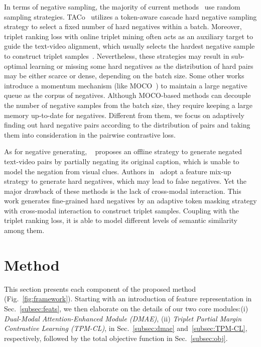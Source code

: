 \documentclass[sigconf]{acmart}
\begin{document}
In terms of negative sampling, the majority of current methods~\cite{actbert2020,univl2020,frozen2021,clip4clip2021,videoclip2022,xclip2022,ts2net2022} use random sampling strategies.
TACo~\cite{taco2021} utilizes a token-aware cascade hard negative sampling strategy to select a fixed number of hard negatives within a batch. 
Moreover, triplet ranking loss with online triplet mining often acts as an auxiliary target to guide the text-video alignment, which usually selects the hardest negative sample to construct triplet samples~\cite{Dong2021DualEF,acp2022,hanet2021}.
Nevertheless, these strategies may result in sub-optimal learning or missing some hard negatives
as the distribution of hard pairs may be either scarce or dense, depending on the batch size.
Some other works~\cite{hit2021,lgdn2022, sstvlmss2022} introduce a momentum mechanism (like MOCO~\cite{moco2019}) to maintain a large negative queue as the corpus of negatives. Although MOCO-based methods can decouple the number of negative samples from the batch size, they require keeping a large memory up-to-date for negatives.
Different from them, we focus on adaptively finding out hard negative pairs according to the distribution of pairs and taking them into consideration in the pairwise contrastive loss.

As for negative generating, ~\cite{Wang2022LearnTU} proposes an offline strategy to generate negated text-video pairs by partially negating its original caption, which is unable to model the negation from visual clues. 
Authors in~\cite{MoCHi2020} adopt a feature mix-up strategy to generate hard negatives, which may lead to false negatives. Yet the major drawback of these methods is the lack of cross-modal interaction.  
This work generates fine-grained hard negatives by an adaptive token masking strategy with cross-modal interaction to construct triplet samples.
Coupling with the triplet ranking loss, it is able to model different levels of semantic similarity among them.

\section{Method}
This section presents each component of the proposed method (Fig.~\ref{fig:framework}). Starting with an introduction of feature representation in Sec.~\ref{subsec:feats}, we then elaborate on the details of our two core modules:(i) \textit{Dual-Modal Attention-Enhanced Module (DMAE)}, (ii) \textit{Triplet Partial Margin Contrastive Learning (TPM-CL)}, in Sec.~\ref{subsec:dmae} and~\ref{subsec:TPM-CL}, respectively, followed by the total objective function in Sec.~\ref{subsec:obj}.
\end{document}
